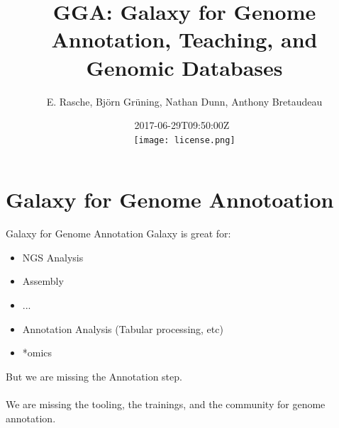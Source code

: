 \documentclass[12pt]{phage3slides} %
\title[Galaxy for Genome Annotation, Teaching, Databases]{GGA: Galaxy for Genome Annotation, Teaching, and Genomic Databases}
\author[ER, BG, ND, AB]{E. Rasche, Bj\"orn Gr\"uning, Nathan Dunn, Anthony Bretaudeau}
\date{2017-06-29T09:50:00Z\ \\\texttt{[image: license.png]}}
\begin{document}
\frame{\titlepage}




\section[GGA]{Galaxy for Genome Annotoation}
\begin{frame}{Galaxy for Genome Annotation}
    Galaxy is great for:
    \begin{itemize}
        \item NGS Analysis
        \item Assembly
        \item ...
        \item Annotation Analysis (Tabular processing, etc)
        \item *omics
    \end{itemize}
    But we are missing the Annotation step.\\\ \\
    We are missing the tooling, the
    trainings, and the community for genome annotation.
\end{frame}
\end{document}

